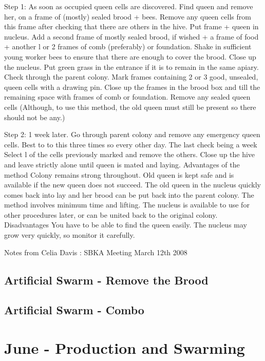 \documentclass{./BeekeepingBook}
\begin{document}
Step 1: As soon as occupied queen cells are discovered.
Find queen and remove her, on a frame of (mostly) sealed brood + bees. Remove any queen cells from this frame after checking that there are others in the hive.
Put frame + queen in nucleus.
Add a second frame of mostly sealed brood, if wished + a frame of food + another l or 2
frames of comb (preferably) or foundation.
Shake in sufficient young worker bees to ensure that there are enough to cover the brood.
Close up the nucleus. Put green grass in the entrance if it is to remain in the same apiary.
Check through the parent colony.  Mark frames containing 2 or 3 good, unsealed, queen cells with a drawing pin.
Close up the frames in the brood box and till the remaining space with frames of comb or foundation.
Remove any sealed queen cells (Although, to use this method, the old queen must still be present so there should not be any.)
 
Step 2: 1 week later.
Go through parent colony and remove any emergency queen cells.  Best to to this three times so every other day.  The last check being a week
Select l of the cells previously marked and remove the others.
Close up the hive and leave strictly alone until queen is mated and laying.
Advantages of the method
Colony remains strong throughout.
Old queen is kept safe and is available if the new queen does not succeed.
The old queen in the nucleus quickly comes back into lay and her brood can be put back into the parent colony.
The method involves minimum time and lifting.
The nucleus is available to use for other procedures later, or can be united back to the original colony.
Disadvantages
You have to be able to find the queen easily.
The nucleus may grow very quickly, so monitor it carefully.
 
Notes from Celia Davis : SBKA Meeting March 12th 2008




\subsection{Artificial Swarm - Remove the Brood}

\subsection{Artificial Swarm - Combo}



\section{June - Production and Swarming}
\end{document}
